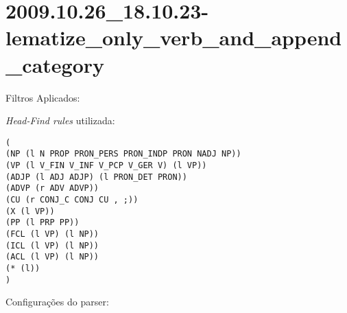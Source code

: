 \section{2009.10.26_18.10.23-lematize_only_verb_and_append_category} %
\label{sec:exp:2009.10.26_18.10.23-lematize_only_verb_and_append_category}

Filtros Aplicados:

\begin{itemize}
  
  \item{\emph{LematizeOnlyVerbAndAppendCategory}
  
\end{itemize}

\emph{Head-Find rules} utilizada:

\scriptsize
\begin{verbatim}
(
(NP (l N PROP PRON_PERS PRON_INDP PRON NADJ NP))
(VP (l V_FIN V_INF V_PCP V_GER V) (l VP))
(ADJP (l ADJ ADJP) (l PRON_DET PRON))
(ADVP (r ADV ADVP))
(CU (r CONJ_C CONJ CU , ;))
(X (l VP))
(PP (l PRP PP))
(FCL (l VP) (l NP))
(ICL (l VP) (l NP))
(ACL (l VP) (l NP))
(* (l))
)

\end{verbatim}

\normalsize

Configurações do parser:

